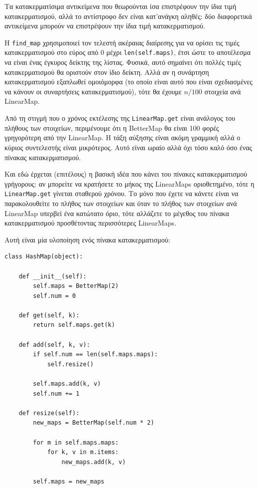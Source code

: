 \documentclass[10pt]{book}
\begin{document}
Τα κατακερματίσιμα αντικείμενα που θεωρούνται ίσα επιστρέφουν την ίδια τιμή κατακερματισμού, αλλά το αντίστροφο δεν είναι κατ'ανάγκη αληθές:  δύο διαφορετικά αντικείμενα μπορούν να επιστρέψουν την ίδια τιμή κατακερματισμού.

Η \verb"find_map" χρησιμοποιεί τον τελεστή ακέραιας διαίρεσης για να ορίσει τις τιμές κατακερματισμού στο
εύρος από 0 μέχρι {\tt len(self.maps)}, έτσι ώστε το αποτέλεσμα να είναι ένας έγκυρος δείκτης της λίστας.
Φυσικά, αυτό σημαίνει ότι πολλές τιμές κατακερματισμού θα οριστούν στον ίδιο δείκτη. Αλλά αν η συνάρτηση 
κατακερματισμού εξαπλωθεί ομοιόμορφα (το οποίο είναι αυτό που είναι σχεδιασμένες να κάνουν οι συναρτήσεις κατακερματισμού), τότε θα έχουμε $n/100$ στοιχεία ανά LinearMap.

Από τη στιγμή που ο χρόνος εκτέλεσης της {\tt LinearMap.get} είναι ανάλογος του πλήθους των στοιχείων, περιμένουμε
ότι η BetterMap θα είναι 100 φορές γρηγορότερη από την  LinearMap.  Η τάξη αύξησης είναι ακόμη γραμμική αλλά ο
κύριος συντελεστής είναι μικρότερος.  Αυτό είναι ωραίο αλλά όχι τόσο καλό όσο ένας πίνακας κατακερματισμού.

Και εδώ έρχεται (επιτέλους) η βασική ιδέα που κάνει του πίνακες κατακερματισμού γρήγορους: αν μπορείτε να
κρατήσετε το μήκος της LinearMaps οριοθετημένο, τότε η {\tt LinearMap.get} γίνεται σταθερού χρόνου.  Το
μόνο που έχετε να κάνετε είναι να παρακολουθείτε το πλήθος των στοιχείων και όταν το πλήθος των στοιχείων
ανά LinearMap υπερβεί ένα κατώτατο όριο, τότε αλλάζετε το μέγεθος του πίνακα κατακερματισμού προσθέτοντας
περισσότερες LinearMaps.

Αυτή είναι μία υλοποίηση ενός πίνακα κατακερματισμού:

\begin{verbatim}
class HashMap(object):

    def __init__(self):
        self.maps = BetterMap(2)
        self.num = 0

    def get(self, k):
        return self.maps.get(k)

    def add(self, k, v):
        if self.num == len(self.maps.maps):
            self.resize()

        self.maps.add(k, v)
        self.num += 1

    def resize(self):
        new_maps = BetterMap(self.num * 2)

        for m in self.maps.maps:
            for k, v in m.items:
                new_maps.add(k, v)

        self.maps = new_maps
\end{verbatim}
\end{document}
